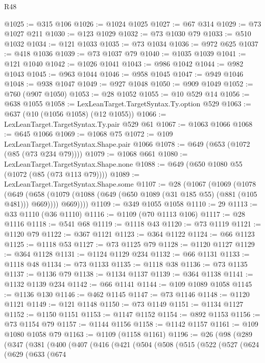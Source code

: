 \begin{lexlean}{R48}
\begin{coremodule}
@1025 := @315 @106
@1026 := @1024 @1025
@1027 := @67 @314
@1029 := @73 @1027 @211
@1030 := @123 @1029
@1032 := @73 @1030 @79
@1033 := @510 @1032
@1034 := @121 @1033
@1035 := @73 @1034
@1036 := @972 @625
@1037 := @418 @1036
@1039 := @73 @1037 @79
@1040 := @1035 @1039
@1041 := @121 @1040
@1042 := @1026 @1041
@1043 := @986 @1042
@1044 := @982 @1043
@1045 := @963 @1044
@1046 := @958 @1045
@1047 := @949 @1046
@1048 := @938 @1047
@1049 := @927 @1048
@1050 := @909 @1049
@1052 := @760 (@907 @1050)
@1053 := @28 @1052
@1055 := @10 @529 @14
@1056 := @638 @1055
@1058 := LexLeanTarget.TargetSyntax.Ty.option @529
@1063 := @637 (@10 (@1056 @1058) (@12 @1055))
@1066 := LexLeanTarget.TargetSyntax.Ty.pair @529 @61
@1067 := @1063 @1066
@1068 := @645 @1066
@1069 := @1068 @75
@1072 := @109 LexLeanTarget.TargetSyntax.Shape.pair @1066
@1078 := @649 (@653 (@1072 (@85 (@73 @234 @79))))
@1079 := @1068 @661
@1080 := LexLeanTarget.TargetSyntax.Shape.none
@1088 := @649 (@650 @1080 @55 (@1072 (@85 (@73 @113 @79))))
@1089 := LexLeanTarget.TargetSyntax.Shape.some
@1107 := @28
    (@1067
      (@1069
        (@1078
          (@649
            (@658 (@1079 (@1088 (@649 (@650 @1089 (@31 @185 @55) (@881 (@105 @481))) @669))))
            @669))))
@1109 := @349 @1055 @1058
@1110 := 29
@1113 := @33 @1110 (@36 @1110)
@1116 := @1109 (@70 @1113 @106)
@1117 := @28 @1116
@1118 := @541 @68
@1119 := @1118 @43
@1120 := @73 @1119
@1121 := @1120 @79
@1122 := @367 @1121
@1123 := @364 @1122
@1124 := @66 @1123
@1125 := @1118 @53
@1127 := @73 @1125 @79
@1128 := @1120 @1127
@1129 := @364 @1128
@1131 := @1124 @1129 @234
@1132 := @66 @1131
@1133 := @1118 @48
@1134 := @73 @1133
@1135 := @1118 @38
@1136 := @73 @1135
@1137 := @1136 @79
@1138 := @1134 @1137
@1139 := @364 @1138
@1141 := @1132 @1139 @234
@1142 := @66 @1141
@1144 := @109 @1089 @1058
@1145 := @1136 @130
@1146 := @462 @1145
@1147 := @73 @1146
@1148 := @1120 @1121
@1149 := @121 @1148
@1150 := @73 @1149
@1151 := @1134 @1127
@1152 := @1150 @1151
@1153 := @1147 @1152
@1154 := @892 @1153
@1156 := @73 @1154 @79
@1157 := @1144 @1156
@1158 := @1142 @1157
@1161 := @109 @1080 @1058 @79
@1163 := @1109 (@1158 @1161)
@1196 := @26
    (@98
      (@289
        (@347
          (@381
            (@400
              (@407
                (@416
                  (@421
                    (@504
                      (@508
                        (@515
                          (@522
                            (@527
                              (@624
                                (@629
                                  (@633
                                    (@674

\end{coremodule}
\end{lexlean}
